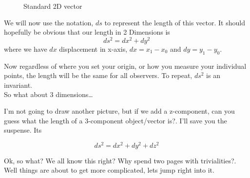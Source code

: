 \begin{figure}[h]
  \centering
{}
\caption{Standard 2D vector}
\label{fig:2dvec}
\end{figure}

We will now use the notation, $ds$ to represent the length of this vector. It should hopefully be obvious that our length in 2 Dimensions is
\begin{equation}
  ds^2 = dx^2 + dy^2
\end{equation}
where we have $dx$ displacement in x-axis, $dx = x_1 - x_0$ and $dy = y_1 - y_0$.  

Now regardless of where you set your origin, or how you measure your individual points, the length will be the same for all observers. To repeat, $ds^2$ is an invariant. \\

So what about 3 dimensions\ldots 

I'm not going to draw another picture, but if we add a z-component, can you guess what the length of a 3-component object/vector is?. I'll save you the suspense. Its

\begin{equation}
  ds^2 = dx^2 + dy^2 + dz^2
\end{equation}

Ok, so what? We all know this right? Why spend two pages with trivialities?. Well things are about to get more complicated, lets jump right into it. 

